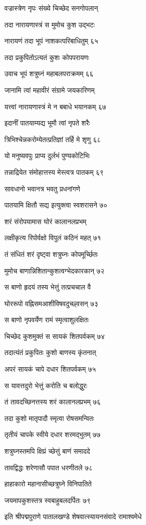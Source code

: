 वज्रास्त्रेण नृपः संख्ये चिच्छेद सनगोपलान्

तदा नारायणास्त्रं स मुमोच कुश उद्भटः

नारायणं तदा भूपं नाशकत्परिबाधितुम् ६५

तदा प्रकुपितोऽत्यतं कुशः कोपपरायणः

उवाच भूपं शत्रुघ्नं महाबलपराक्रमम् ६६

जानामि त्वां महावीरं संग्रामे जयकारिणम्

यत्त्वां नारायणास्त्रं मे न बबाधे भयानकम् ६७

इदानीं पातयाम्यद्य भूमौ त्वां नृपते शरैः

त्रिभिश्चेन्नकरोम्येतत्प्रतिज्ञां तर्हि मे शृणु ६८

यो मनुष्यवपुः प्राप्य दुर्लभं पुण्यकोटिभिः

तन्नाद्रियेत संमोहात्तस्य मेस्त्वत्र पातकम् ६९

सावधानो भवानत्र भवतु प्रधनांगणे

पातयामि क्षितौ सद्य इत्युक्त्वा स्वशरासने ७०

शरं संरोपयामास घोरं कालानलप्रभम्

लक्षीकृत्य रिपोर्वक्षो विपुलं कठिनं महत् ७१

तं संधितं शरं दृष्ट्वा शत्रुघ्नः कोपमूर्च्छितः

मुमोच बाणान्निशितान्कुशत्वग्भेदकारकान् ७२

स बाणो हृदयं तस्य भेत्तुं तत्प्रचचाल वै

घोररूपो वह्निसमआशीविषवदुच्छ्वसन् ७३

स बाणो नृपवर्येण रामं स्मृत्वाशुलक्षितः

चिच्छेद कुशमुक्तं स सायकं शितपर्वकम् ७४

तदात्यंतं प्रकुपितः कुशो बाणस्य कृंतनात्

अपरं सायकं चापे दधार शितपर्वकम् ७५

स यावत्तदुरो भेत्तुं करोति च बलोद्धुरः

तं तावदच्छिनत्तस्य शरं कालानलप्रभम् ७६

तदा कुशो मातृपादौ स्मृत्वा रोषसमन्वितः

तृतीयं चापके स्वीये दधार शरमद्भुतम् ७७

शत्रुघ्नस्तमपि क्षिप्रं च्छेत्तुं बाणं समाददे

तावद्विद्धः शरेणासौ पपात धरणीतले ७८

हाहाकारो महानासीच्छत्रुघ्ने विनिपातिते

जयमापकुशस्तत्र स्वबाहुबलदर्पितः ७९

इति श्रीपद्मपुराणे पातालखण्डे शेषवात्स्यायनसंवादे रामाश्वमेधे

